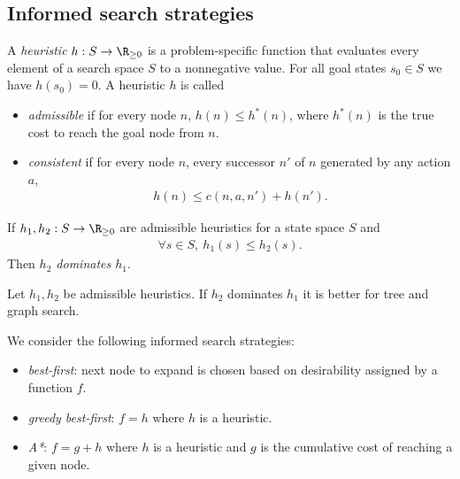 \documentclass{article}
\begin{document}
\subsection{Informed search strategies}

\begin{definition}[R\&N p. 92]
    A \emph{heuristic} $h:S\to \R_{\geq 0}$ is a problem-specific function
    that evaluates every element of a search space $S$ to a nonnegative value.
    For all goal states $s_0\in S$ we have $h(s_0)=0$.
    A heuristic $h$ is called
    \begin{itemize}
        \item \emph{admissible} if for every node $n$, $h(n)\leq h^*(n)$,
              where $h^*(n)$ is the true cost to reach the goal node from $n$.
        \item \emph{consistent} if for every node $n$, every
              successor $n'$ of $n$ generated by any action $a$,
              \begin{align*}
                  h(n) \leq c(n, a, n') + h(n').
              \end{align*}
    \end{itemize}
    If $h_1,h_2:S\to \R_{\geq 0}$ are admissible heuristics for a state
    space $S$ and
    \begin{align*}
        \forall s\in S,\: h_1(s) \leq h_2(s).
    \end{align*}
    Then \emph{$h_2$ dominates $h_1$}.
\end{definition}

\begin{theorem}
    Let $h_1,h_2$ be admissible heuristics. If $h_2$ dominates $h_1$ it is
    better for tree and graph search.
\end{theorem}

\begin{definition}
    We consider the following informed search strategies:
    \begin{itemize}
        \item \emph{best-first}: next node to expand is chosen based on desirability assigned by a function $f$.
        \item \emph{greedy best-first}: $f=h$ where $h$ is a heuristic.
        \item \emph{A*}: $f=g+h$ where $h$ is a heuristic and $g$ is the cumulative cost of reaching a given node.
    \end{itemize}
\end{definition}
\end{document}
